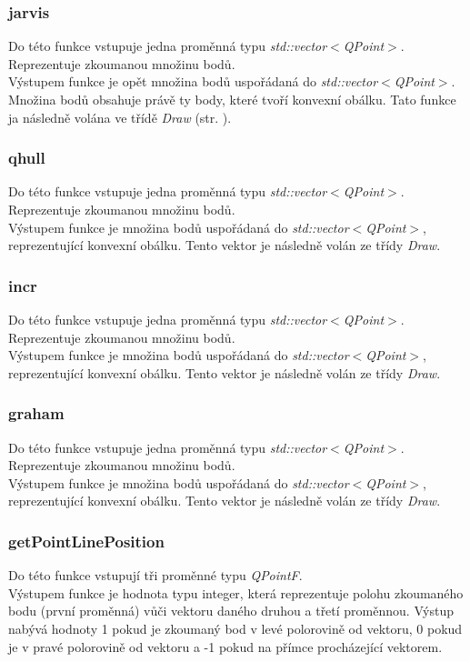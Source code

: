\documentclass{article}
\begin{document}
\subsubsection{jarvis}
Do této funkce vstupuje jedna proměnná typu  \emph{std::vector$<$QPoint$>$}. Reprezentuje zkoumanou množinu bodů.\\
Výstupem funkce je opět množina bodů uspořádaná do \emph{std::vector$<$QPoint$>$}. Množina bodů obsahuje právě ty body, které tvoří konvexní obálku. Tato funkce ja následně volána ve třídě \emph{Draw} (str. \pageref{sec:draw}).

\subsubsection{qhull}
Do této funkce vstupuje jedna proměnná typu  \emph{std::vector$<$QPoint$>$}. Reprezentuje zkoumanou množinu bodů.\\
Výstupem funkce je množina bodů uspořádaná do \emph{std::vector$<$QPoint$>$}, reprezentující konvexní obálku. Tento vektor je následně volán ze třídy \emph{Draw}.

\subsubsection{incr}
Do této funkce vstupuje jedna proměnná typu  \emph{std::vector$<$QPoint$>$}. Reprezentuje zkoumanou množinu bodů.\\
Výstupem funkce je množina bodů uspořádaná do \emph{std::vector$<$QPoint$>$}, reprezentující konvexní obálku. Tento vektor je následně volán ze třídy \emph{Draw}.

\subsubsection{graham}
Do této funkce vstupuje jedna proměnná typu  \emph{std::vector$<$QPoint$>$}. Reprezentuje zkoumanou množinu bodů.\\
Výstupem funkce je množina bodů uspořádaná do \emph{std::vector$<$QPoint$>$}, reprezentující konvexní obálku. Tento vektor je následně volán ze třídy \emph{Draw}.

\subsubsection{getPointLinePosition}
Do této funkce vstupují tři proměnné typu \emph{QPointF}.\\
Výstupem funkce je hodnota typu integer, která reprezentuje polohu zkoumaného bodu (první proměnná) vůči vektoru daného druhou a třetí proměnnou. Výstup nabývá hodnoty 1 pokud je zkoumaný bod v levé polorovině od vektoru, 0 pokud je v pravé polorovině od vektoru a -1 pokud na přímce procházející vektorem.
\end{document}

